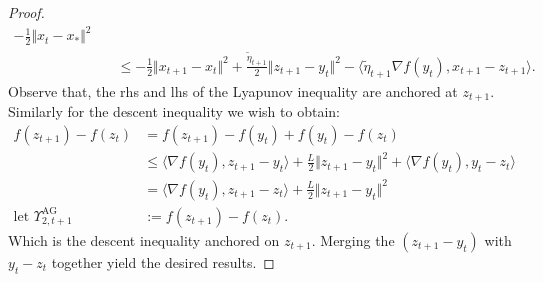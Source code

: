 \documentclass[12pt]{article}
\begin{document}
\begin{proof}
{\begin{align*}
                - \frac{1}{2}\Vert x_{t} - x_*\Vert^2 
                \\
                &\quad \le 
                -\frac{1}{2} \Vert x_{t + 1 } - x_t\Vert^2 + 
                \frac{\tilde \eta_{t + 1}}{2}\Vert z_{t + 1} - y_t\Vert^2 
                - \langle \tilde \eta_{t + 1}\nabla f(y_t), x_{t + 1} - z_{t + 1} \rangle. 
            \end{align*}
            }
            Observe that, the rhs and lhs of the Lyapunov inequality are anchored at $z_{t + 1}$. 
            Similarly for the descent inequality we wish to obtain: 
            \begin{align*}
                f(z_{t + 1}) - f(z_t) &= f(z_{t + 1}) - f(y_t) + f(y_t) - f(z_t) 
                \\
                &\le 
                \langle \nabla f(y_t), z_{t + 1} - y_t\rangle + \frac{L}{2}\Vert z_{t + 1} - y_t\Vert^2 
                + 
                \langle \nabla f(y_t), y_t - z_t\rangle
                \\
                &= 
                \langle \nabla f(y_t), z_{t + 1} - z_t\rangle + \frac{L}{2}\Vert z_{t + 1} - y_t\Vert^2
                \\
                \text{let }\Upsilon_{2, t + 1}^{\text{AG}} 
                &:= f(z_{t + 1}) - f(z_t). 
            \end{align*}
            Which is the descent inequality anchored on $z_{t + 1}$.
            Merging the $(z_{t + 1} - y_t)$ with $y_t - z_t$ together yield the desired results. 
        \end{proof}
\end{document}
